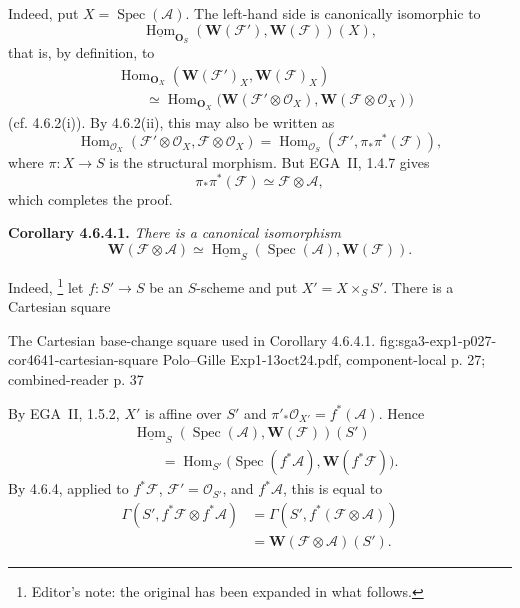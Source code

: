 Indeed, put \(X=\operatorname{Spec}(\mathscr A)\). The left-hand side is
canonically isomorphic to
\[
  \underline{\operatorname{Hom}}_{\mathbf O_S}
    (\mathbf W(\mathscr F'),\mathbf W(\mathscr F))(X),
\]
that is, by definition, to
\begin{align*}
  &\operatorname{Hom}_{\mathbf O_X}
    (\mathbf W(\mathscr F')_X,\mathbf W(\mathscr F)_X)\\
  &\qquad\simeq
  \operatorname{Hom}_{\mathbf O_X}
    \bigl(\mathbf W(\mathscr F'\otimes\mathcal O_X),
          \mathbf W(\mathscr F\otimes\mathcal O_X)\bigr)
\end{align*}
(cf. 4.6.2(i)). By 4.6.2(ii), this may also be written as
\[
  \operatorname{Hom}_{\mathcal O_X}
    (\mathscr F'\otimes\mathcal O_X,\mathscr F\otimes\mathcal O_X)
  =
  \operatorname{Hom}_{\mathcal O_S}
    (\mathscr F',\pi_*\pi^*(\mathscr F)),
\]
where \(\pi:X\to S\) is the structural morphism. But EGA~II, 1.4.7
gives
\[
  \pi_*\pi^*(\mathscr F)\simeq\mathscr F\otimes\mathscr A,
\]
which completes the proof.

\medskip
\noindent\textbf{Corollary 4.6.4.1.}
\textit{There is a canonical isomorphism
\[
  \mathbf W(\mathscr F\otimes\mathscr A)
    \simeq
  \underline{\operatorname{Hom}}_S
    (\operatorname{Spec}(\mathscr A),\mathbf W(\mathscr F)).
\]}

Indeed,
\footnote{Editor's note: the original has been expanded in what follows.}
let \(f:S'\to S\) be an \(S\)-scheme and put
\(X'=X\times_S S'\). There is a Cartesian square

  {The Cartesian base-change square used in Corollary 4.6.4.1.}
  {fig:sga3-exp1-p027-cor4641-cartesian-square}
  {Polo--Gille Exp1-13oct24.pdf, component-local p. 27; combined-reader p. 37}

By EGA~II, 1.5.2, \(X'\) is affine over \(S'\) and
\(\pi'_*\mathcal O_{X'}=f^*(\mathscr A)\). Hence
\begin{align*}
  &\underline{\operatorname{Hom}}_S
     (\operatorname{Spec}(\mathscr A),\mathbf W(\mathscr F))(S')\\
  &\qquad=
  \operatorname{Hom}_{S'}
     \bigl(\operatorname{Spec}(f^*\mathscr A),
           \mathbf W(f^*\mathscr F)\bigr).
\end{align*}
By 4.6.4, applied to \(f^*\mathscr F\),
\(\mathscr F'=\mathcal O_{S'}\), and \(f^*\mathscr A\), this is equal
to
\begin{align*}
  \Gamma(S',f^*\mathscr F\otimes f^*\mathscr A)
    &=\Gamma(S',f^*(\mathscr F\otimes\mathscr A))\\
    &=\mathbf W(\mathscr F\otimes\mathscr A)(S').
\end{align*}

